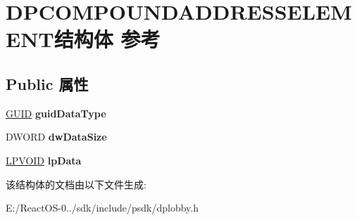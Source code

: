 \hypertarget{struct_d_p_c_o_m_p_o_u_n_d_a_d_d_r_e_s_s_e_l_e_m_e_n_t}{}\section{D\+P\+C\+O\+M\+P\+O\+U\+N\+D\+A\+D\+D\+R\+E\+S\+S\+E\+L\+E\+M\+E\+N\+T结构体 参考}
\label{struct_d_p_c_o_m_p_o_u_n_d_a_d_d_r_e_s_s_e_l_e_m_e_n_t}
\subsection*{Public 属性}
\begin{DoxyCompactItemize}
\item 
\mbox{\label{struct_d_p_c_o_m_p_o_u_n_d_a_d_d_r_e_s_s_e_l_e_m_e_n_t_ae9a3b16fa99f39c243c78061fca409b5}} 
\hyperlink{interface_g_u_i_d}{G\+U\+ID} {\bfseries guid\+Data\+Type}
\item 
\mbox{\label{struct_d_p_c_o_m_p_o_u_n_d_a_d_d_r_e_s_s_e_l_e_m_e_n_t_a549bf2ef4ecab04954a6c55deba51266}} 
D\+W\+O\+RD {\bfseries dw\+Data\+Size}
\item 
\mbox{\label{struct_d_p_c_o_m_p_o_u_n_d_a_d_d_r_e_s_s_e_l_e_m_e_n_t_a0de7ef05a3e766e85a3283370a35bd4d}} 
\hyperlink{interfacevoid}{L\+P\+V\+O\+ID} {\bfseries lp\+Data}
\end{DoxyCompactItemize}


该结构体的文档由以下文件生成\+:\begin{DoxyCompactItemize}
\item 
E\+:/\+React\+O\+S-\/0../sdk/include/psdk/dplobby.\+h\end{DoxyCompactItemize}
